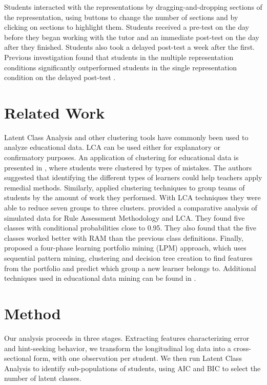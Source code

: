 \documentclass{edm_template}
\begin{document}
Students interacted with the representations by dragging-and-dropping sections of the representation, using buttons to change the number of sections and by clicking on sections to highlight them. Students received a pre-test on the day before they began working with the tutor and an immediate post-test on the day after they finished. Students also took a delayed post-test a week after the first. Previous investigation found that students in the multiple representation conditions significantly outperformed students in the single representation condition on the delayed post-test \cite{Rau2012}. 

\section{Related Work}
\label{sec:related-work}

Latent Class Analysis and other clustering tools have commonly been used to analyze educational data. LCA can be used either for explanatory or confirmatory purposes. An application of clustering for educational data is presented in \cite{Merceron2005}, where students were clustered by types of mistakes. The authors suggested that identifying the different types of learners could help teachers apply remedial methods. Similarly, \cite{Perera2009} applied clustering techniques to group teams of students by the amount of work they performed. With LCA techniques they were able to reduce seven groups to three clusters. \cite{Maas2008} provided a comparative analysis of simulated data for Rule Assessment Methodology and LCA. They found five classes with conditional probabilities close to 0.95. They also found that the five classes worked better with RAM than the previous class definitions. Finally, \cite{Su2006} proposed a four-phase learning portfolio mining (LPM) approach, which uses sequential pattern mining, clustering and decision tree creation to find features from the portfolio and predict which group a new learner belongs to. Additional techniques used in educational data mining can be found in \cite{Romero2007}.
 
\section{Method}
\label{sec:method}

Our analysis proceeds in three stages. Extracting features characterizing error and hint-seeking behavior, we transform the longitudinal log data into a cross-sectional form, with one observation per student. We then run Latent Class Analysis to identify sub-populations of students, using AIC and BIC to select the number of latent classes. 
\end{document}

